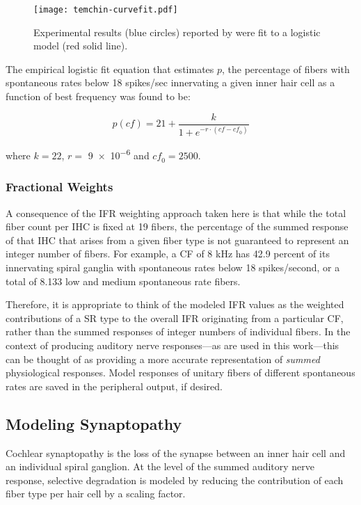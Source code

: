 \begin{figure}[htbp]
	\centering
	\texttt{[image: temchin-curvefit.pdf]}
	\caption[Variation in Spontaneous Rate as a Function of Frequency]{Experimental results (blue circles) reported by \cite{Temchin2008Threshold} were fit to a logistic model (red solid line).}
	\label{fig:temchin-curvefit}
\end{figure}

The empirical logistic fit equation that estimates $p$, the percentage of fibers with spontaneous rates below 18 spikes/sec innervating a given inner hair cell as a function of best frequency was found to be: 

\begin{equation}
	p(\mathit{cf}) = 21 + \frac{k}{1+e^{-r\cdot(\mathit{cf}-\mathit{cf}_0)}}
\end{equation}

where $k = 22$, $r = $ \num{9e-6} and $\mathit{cf}_0 = 2500$.

\subsubsection{Fractional Weights}
A consequence of the IFR weighting approach taken here is that while the total fiber count per IHC is fixed at 19 fibers, the percentage of the summed response of that IHC that arises from a given fiber type is not guaranteed to represent an integer number of fibers.  For example, a CF of 8 kHz has 42.9 percent of its innervating spiral ganglia with spontaneous rates below 18 spikes/second, or a total of 8.133 low and medium spontaneous rate fibers.  

Therefore, it is appropriate to think of the modeled IFR values as the weighted contributions of a SR type to the overall IFR originating from a particular CF, rather than the summed responses of integer numbers of individual fibers.  In the context of producing auditory nerve responses---as are used in this work---this can be thought of as providing a more accurate representation of \emph{summed} physiological responses. Model responses of unitary fibers of different spontaneous rates are saved in the peripheral output, if desired.

\subsection{Modeling Synaptopathy} %
\label{sub:modeling_synaptopathy}
Cochlear synaptopathy is the loss of the synapse between an inner hair cell and an individual spiral ganglion.  At the level of the summed auditory nerve response, selective degradation is modeled by reducing the contribution of each fiber type per hair cell by a scaling factor. 

